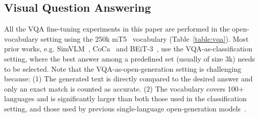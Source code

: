 \documentclass{article}
\begin{document}
\subsection{Visual Question Answering}

All the VQA fine-tuning experiments in this paper are performed in the open-vocabulary setting using the 250k mT5~\citep{xue-2021-mt5} vocabulary (Table~\ref{table:vqa}).
Most prior works, e.g. SimVLM~\citep{simvlm}, CoCa~\citep{coca} and BEiT-3~\citep{beit3}, use the VQA-as-classification setting, where the best answer among a predefined set (usually of size 3k) needs to be selected.
Note that the VQA-as-open-generation setting is challenging because:
(1) The generated text is directly compared to the desired answer and only an exact match is counted as accurate. (2) The \NAME vocabulary covers 100+ languages and is significantly larger than both those used in the classification setting, and those used by previous single-language open-generation models~\citep{flamingo,git}.
\end{document}
